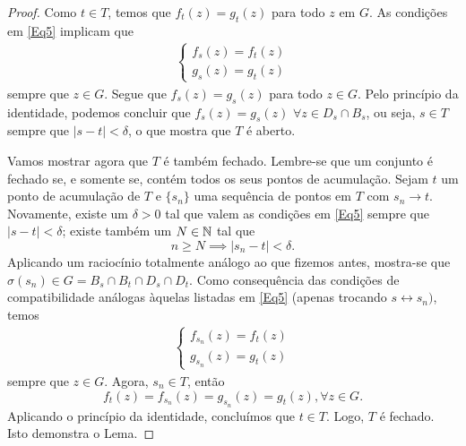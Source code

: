 \begin{proof}
        Como $t \in T$, temos que $f_t(z) = g_t(z)$ para todo $z$ em $G$. 
        As condições em \ref{Eq5} implicam que 
        \begin{align*}
            \begin{cases}
                f_s(z) = f_t(z) \\
                g_s(z) = g_t(z)
            \end{cases}
        \end{align*}
        sempre que $z \in G$. Segue que $f_s(z) = g_s(z)$ para todo $z \in G$. 
        Pelo princípio da identidade, podemos concluir que 
        $f_s(z) = g_s(z)$ $\forall z \in D_s \cap B_s$, ou seja, $s \in T$ sempre que 
        $|s-t|< \delta$, o que mostra que $T$ é aberto.
        
        Vamos mostrar agora que $T$ é também fechado. Lembre-se que um conjunto é fechado 
        se, e somente se, contém todos os seus pontos de acumulação. Sejam $t$ um ponto de
        acumulação de $T$ e $\{s_n\}$ uma sequência de pontos em $T$ com $s_n \to t$. 
        Novamente, existe um $\delta > 0$ tal que valem as condições em \ref{Eq5} sempre que
        $|s-t|<\delta$; existe também um $N \in \mathbb{N}$ tal que
        \begin{equation*}
            n \geq N \implies |s_n - t| < \delta.
        \end{equation*}
        Aplicando um raciocínio totalmente análogo ao que fizemos antes, mostra-se que
        $\sigma(s_n) \in G = B_s \cap B_t \cap D_s \cap D_t$. Como consequência das 
        condições de compatibilidade análogas àquelas listadas em \ref{Eq5} 
        (apenas trocando $s \leftrightarrow s_n)$, temos
        \begin{align*}
            \begin{cases}
                f_{s_n}(z) = f_t(z) \\
                g_{s_n}(z) = g_t(z)
            \end{cases}
        \end{align*}
        sempre que $z \in G$. Agora, $s_n \in T$, então
        \begin{equation*}
            f_t(z) = f_{s_n}(z) = g_{s_n}(z) = g_t(z), \forall z\in G .
        \end{equation*}
        Aplicando o princípio da identidade, concluímos que $t \in T$. Logo, $T$ é fechado. 
        Isto demonstra o Lema.
    \end{proof}

